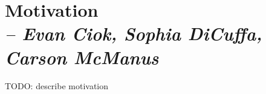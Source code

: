 \chapter{Motivation \\
  \small{\textit{-- Evan Ciok, Sophia DiCuffa, Carson McManus}}
  \label{Chapter::Motivation}}


TODO: describe motivation
